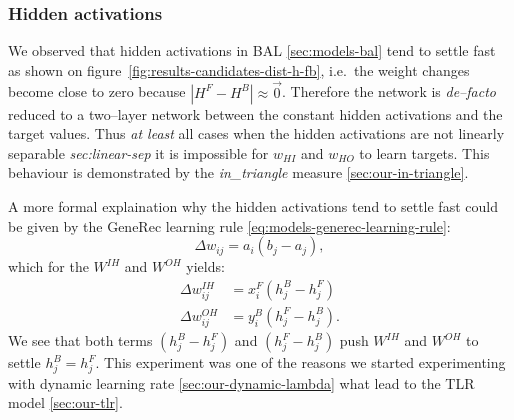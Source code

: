 
\subsubsection{Hidden activations}
\label{sec:our-hidden-activation} 

We observed that hidden activations in BAL \ref{sec:models-bal} tend to settle fast as shown on figure~\ref{fig:results-candidates-dist-h-fb}, i.e.~the weight changes become close to zero because $|H^F - H^B| \approx \overrightarrow{0}$. Therefore the network is \emph{de--facto} reduced to a two--layer network between the constant hidden activations and the target values. Thus \emph{at least} all cases when the hidden activations are not linearly separable \emph{sec:linear-sep} it is impossible for $w_{HI}$ and $w_{HO}$ to learn targets. This behaviour is demonstrated by the \emph{in\_triangle} measure \ref{sec:our-in-triangle}. 

A more formal explaination why the hidden activations tend to settle fast could be given by the GeneRec learning rule \ref{eq:models-generec-learning-rule}: 
\begin{equation} 
  \Delta w_{ij} = a_i(b_j - a_j),
\end{equation} \nonumber 
which for the $W^{IH}$ and $W^{OH}$ yields: 
\begin{align} 
  \Delta w_{ij}^{IH} &= x^F_i(h^B_j - h^F_j) \nonumber \\ 
  \Delta w_{ij}^{OH} &= y^B_i(h^F_j - h^B_j). \nonumber  
\end{align} 
We see that both terms $(h^B_j - h^F_j)$ and $(h^F_j - h^B_j)$ push $W^{IH}$ and $W^{OH}$ to settle $h^B_j = h^F_j$. This experiment was one of the reasons we started experimenting with dynamic learning rate \ref{sec:our-dynamic-lambda} what lead to the TLR model \ref{sec:our-tlr}. 

